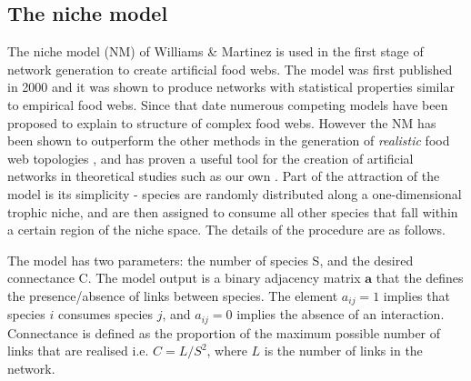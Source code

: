 

\subsection{The niche model}
\label{sec:niche_model}


The niche model (NM) of Williams \& Martinez \cite{williams2000simple} is used in the first stage of network generation to create artificial food webs. The model was first published in 2000 and it was shown to produce networks with statistical properties similar to empirical food webs. Since that date numerous competing models have been proposed \cite{stouffer2005quantitative} to explain to structure of complex food webs. However the NM has been shown to outperform the other methods in the generation of \emph{realistic} food web topologies \cite{williams2008success}, and has proven a useful tool for the creation of artificial networks in theoretical studies such as our own \cite{c2008food,dunne2002food,staniczenko2010structural,lurgi2015effects}. Part of the attraction of the model is its simplicity - species are randomly distributed along a one-dimensional trophic niche, and are then assigned to consume all other species that fall within a certain region of the niche space. The details of the procedure are as follows. 

The model has two parameters: the number of species S, and the desired connectance C. The model output is a binary adjacency matrix $\mathbf{a}$ that the defines the presence/absence of links between species. The element $a_{ij} = 1$ implies that species $i$ consumes species $j$, and $a_{ij} = 0$ implies the absence of an interaction. Connectance is defined as the proportion of the maximum possible number of links that are realised i.e. $C = L/S^2$, where $L$ is the number of links in the network.

